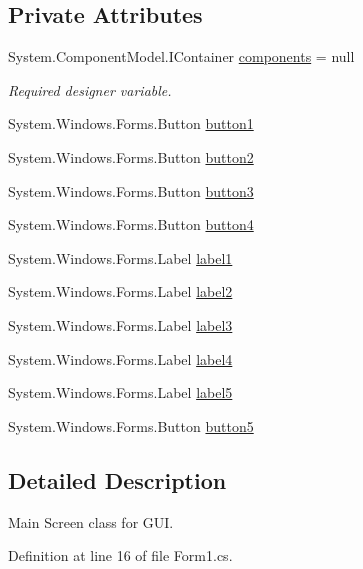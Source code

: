 \subsection*{Private Attributes}
\begin{DoxyCompactItemize}
\item 
System.\+Component\+Model.\+I\+Container \hyperlink{classPCO_1_1Form1_a3b09f718fe7978234deb2b07c408fa71}{components} = null
\begin{DoxyCompactList}\small\item\em Required designer variable. \end{DoxyCompactList}\item 
System.\+Windows.\+Forms.\+Button \hyperlink{classPCO_1_1Form1_a8ea6e906a7b8a9ff5374e57bd6570c28}{button1}
\item 
System.\+Windows.\+Forms.\+Button \hyperlink{classPCO_1_1Form1_ad629df09d9f3eb537456ea999592562f}{button2}
\item 
System.\+Windows.\+Forms.\+Button \hyperlink{classPCO_1_1Form1_a4c4c4c6c02637dd42e4e1eb28ad0bb45}{button3}
\item 
System.\+Windows.\+Forms.\+Button \hyperlink{classPCO_1_1Form1_a9632899f8786d9bf6dea208f92f2a9d1}{button4}
\item 
System.\+Windows.\+Forms.\+Label \hyperlink{classPCO_1_1Form1_a28dd6ac426e555c53e48107162d37833}{label1}
\item 
System.\+Windows.\+Forms.\+Label \hyperlink{classPCO_1_1Form1_a0018e6d59e6dbaf60b014be9200c1c2f}{label2}
\item 
System.\+Windows.\+Forms.\+Label \hyperlink{classPCO_1_1Form1_ad81b3baeca0a08bddb892e197e578c1e}{label3}
\item 
System.\+Windows.\+Forms.\+Label \hyperlink{classPCO_1_1Form1_ae4d45412062796c988d21cf3a4cb5fc2}{label4}
\item 
System.\+Windows.\+Forms.\+Label \hyperlink{classPCO_1_1Form1_a3faec789952b1617b9cdc477e7d7e32b}{label5}
\item 
System.\+Windows.\+Forms.\+Button \hyperlink{classPCO_1_1Form1_a1a8057e529d3c7f692722d9d265aacf8}{button5}
\end{DoxyCompactItemize}


\subsection{Detailed Description}
Main Screen class for G\+UI. 

Definition at line 16 of file Form1.\+cs.



